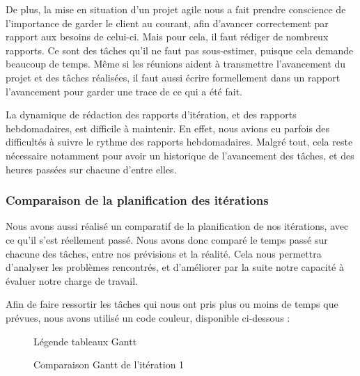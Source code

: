 \documentclass[12pt,titlepage,french]{article}
\begin{document}
De plus, la mise en situation d'un projet agile nous a fait prendre conscience de l'importance de garder le client au courant, afin d'avancer correctement par rapport aux besoins de celui-ci. Mais pour cela, il faut rédiger de nombreux rapports. Ce sont des tâches qu'il ne faut pas sous-estimer, puisque cela demande beaucoup de temps. Même si les réunions aident à transmettre l'avancement du projet et des tâches réalisées, il faut aussi écrire formellement dans un rapport l'avancement pour garder une trace de ce qui a été fait. \newline

La dynamique de rédaction des rapports d'itération, et des rapports hebdomadaires, est difficile à maintenir. En effet, nous avions eu parfois des difficultés à suivre le rythme des rapports hebdomadaires. Malgré tout, cela reste nécessaire notamment pour avoir un historique de l'avancement des tâches, et des heures passées sur chacune d'entre elles.

\subsubsection{Comparaison de la planification des itérations}

Nous avons aussi réalisé un comparatif de la planification de nos itérations, avec ce qu'il s'est réellement passé. Nous avons donc comparé le temps passé sur chacune des tâches, entre nos prévisions et la réalité. Cela nous permettra d'analyser les problèmes rencontrés, et d'améliorer par la suite notre capacité à évaluer notre charge de travail. \newline

Afin de faire ressortir les tâches qui nous ont pris plus ou moins de temps que prévues, nous avons utilisé un code couleur, disponible ci-dessous :

\begin{figure}[H]
    \caption{\label{} Légende tableaux Gantt}
\end{figure}


\begin{figure}[H]
    \caption{\label{} Comparaison Gantt de l'itération 1}
\end{figure}
\end{document}
